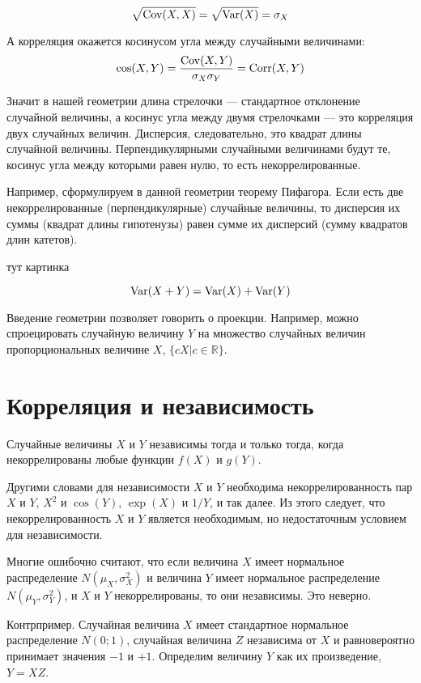 \documentclass[10pt]{article}
\newcommand{\RR}{\mathbb{R}}
\begin{document}
\[
\sqrt{\operatorname{Cov}(X,X)}=\sqrt{\operatorname{Var}(X)}=\sigma_X
\]

А корреляция окажется косинусом угла между случайными величинами:
\[
\cos(X,Y)=\frac{\operatorname{Cov}(X,Y)}{\sigma_X\sigma_Y}=\operatorname{Corr}(X,Y)
\]


Значит в нашей геометрии  длина стрелочки --- стандартное отклонение случайной величины, а косинус угла между двумя стрелочками --- это корреляция двух случайных величин. Дисперсия, следовательно, это квадрат длины случайной величины. Перпендикулярными случайными величинами будут те, косинус угла между которыми равен нулю, то есть некоррелированные.

Например, сформулируем в данной геометрии теорему Пифагора. Если есть две некоррелированные (перпендикулярные) случайные величины, то дисперсия их суммы (квадрат длины гипотенузы) равен сумме их дисперсий (сумму квадратов длин катетов).


тут картинка

\[
\operatorname{Var}(X+Y)=\operatorname{Var}(X)+\operatorname{Var}(Y)
\]

Введение геометрии позволяет говорить о проекции. Например, можно спроецировать случайную величину $Y$ на множество случайных величин пропорциональных величине $X$, $\{cX | c\in \RR \}$.



\section{Корреляция и независимость}

\begin{theorem}
Случайные величины $X$ и $Y$ независимы тогда и только тогда, когда некоррелированы любые функции $f(X)$ и $g(Y)$.
\end{theorem}

Другими словами для независимости $X$ и $Y$ необходима некоррелированность пар $X$ и $Y$, $X^2$ и $\cos(Y)$, $\exp(X)$ и $1/Y$, и так далее. Из этого следует, что некоррелированность $X$ и $Y$ является необходимым, но недостаточным условием для независимости.

Многие ошибочно считают, что если величина $X$ имеет нормальное распределение $N(\mu_X, \sigma^2_X)$ и величина $Y$ имеет нормальное распределение $N(\mu_Y, \sigma^2_Y)$, и $X$ и $Y$ некоррелированы, то они независимы. Это неверно.

Контрпример. Случайная величина $X$ имеет стандартное нормальное распределение $N(0;1)$, случайная величина $Z$ независима от $X$ и равновероятно принимает значения $-1$ и $+1$. Определим величину $Y$ как их произведение, $Y=XZ$. 
\end{document}
